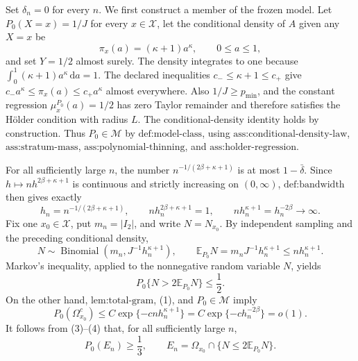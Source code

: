 Set \(\delta_n=0\) for every \(n\).  We first construct a member of the frozen model.  Let \(P_0(X=x)=1/J\) for every \(x\in\mathcal X\), let the conditional density of \(A\) given any \(X=x\) be
\[
\pi_x(a)=(\kappa+1)a^\kappa,\qquad 0\leq a\leq1,
\]
and set \(Y=1/2\) almost surely.  The density integrates to one because
\(\int_0^1(\kappa+1)a^\kappa\,\mathrm da=1\).  The declared inequalities \(c_-\leq\kappa+1\leq c_+\) give
\(c_-a^\kappa\leq\pi_x(a)\leq c_+a^\kappa\) almost everywhere.  Also \(1/J\geq p_{\min}\), and the constant regression \(\mu_x^{P_0}(a)=1/2\) has zero Taylor remainder and therefore satisfies the Hölder condition with radius \(L\).  The conditional-density identity holds by construction.  Thus \(P_0\in\mathcal M\) by \(\text{def:model-class}\), using \(\text{ass:conditional-density-law}\), \(\text{ass:stratum-mass}\), \(\text{ass:polynomial-thinning}\), and \(\text{ass:holder-regression}\).

For all sufficiently large \(n\), the number \(n^{-1/(2\beta+\kappa+1)}\) is at most \(1-\bar\delta\).  Since \(h\mapsto nh^{2\beta+\kappa+1}\) is continuous and strictly increasing on \((0,\infty)\), \(\text{def:bandwidth}\) then gives exactly
\[
h_n=n^{-1/(2\beta+\kappa+1)},
\qquad
nh_n^{2\beta+\kappa+1}=1,
\qquad
nh_n^{\kappa+1}=h_n^{-2\beta}\longrightarrow\infty.
\tag{1}
\]
Fix one \(x_0\in\mathcal X\), put \(m_n=|I_2|\), and write \(N=N_{x_0}\).  By independent sampling and the preceding conditional density,
\[
N\sim\operatorname{Binomial}\!\left(m_n,J^{-1}h_n^{\kappa+1}\right),
\qquad
\mathbb E_{P_0}N=m_nJ^{-1}h_n^{\kappa+1}\leq nh_n^{\kappa+1}.
\tag{2}
\]
Markov's inequality, applied to the nonnegative random variable \(N\), yields
\[
P_0\{N>2\mathbb E_{P_0}N\}\leq\frac12.
\tag{3}
\]
On the other hand, \(\text{lem:total-gram}\), (1), and \(P_0\in\mathcal M\) imply
\[
P_0(\Omega_{x_0}^c)
\leq C\exp\{-cnh_n^{\kappa+1}\}
=C\exp\{-ch_n^{-2\beta}\}=o(1).
\tag{4}
\]
It follows from (3)--(4) that, for all sufficiently large \(n\),
\[
P_0(E_n)\geq\frac13,
\qquad
E_n=\Omega_{x_0}\cap\{N\leq2\mathbb E_{P_0}N\}.
\tag{5}
\]

